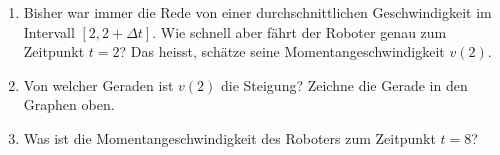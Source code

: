 \begin{LA}
\begin{enumerate}
\begin{center}
\begin{tabular}{p{1.5cm} p{1.5cm} p{1.5cm} p{1.5cm} p{1.5cm} p{1.5cm}}
        \end{tabular}
    \end{center}
  

    \item Bisher war immer die Rede von einer durchschnittlichen Geschwindigkeit im Intervall $[2,2+\Delta t]$. Wie schnell aber fährt der Roboter genau zum Zeitpunkt $t=2$? Das heisst, schätze seine Momentangeschwindigkeit $v(2)$.
    \item Von welcher Geraden ist $v(2)$ die Steigung? Zeichne die Gerade in den Graphen oben.
    \item Was ist die Momentangeschwindigkeit des Roboters zum Zeitpunkt $t=8$?
\end{enumerate}



\end{LA}

